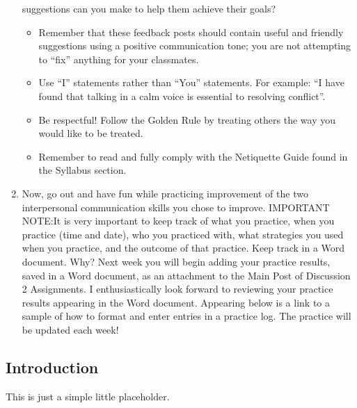 \documentclass[stu,12pt]{apa7}
\begin{document}
\begin{enumerate}
          suggestions can you make to help them achieve their goals?
          \begin{itemize}
            \item Remember that these feedback posts should contain useful and
              friendly suggestions using a positive communication tone; you are
              not attempting to “fix” anything for your classmates.
            \item Use “I” statements rather than “You” statements. For example:
              ``I have found that talking in a calm voice is essential to
              resolving conflict''.
            \item Be respectful! Follow the Golden Rule by treating others the
              way you would like to be treated.
            \item Remember to read and fully comply with the Netiquette Guide
              found in the Syllabus section. 
          \end{itemize}
        \item Now, go out and have fun while practicing improvement of the two
          interpersonal communication skills you chose to improve. IMPORTANT
          NOTE:\@ It is very important to keep track of what you practice, when
          you practice (time and date), who you practiced with, what strategies
          you used when you practice, and the outcome of that practice. Keep
          track in a Word document. Why? Next week you will begin adding your
          practice results, saved in a Word document, as an attachment to the
          Main Post of Discussion 2 Assignments. I enthusiastically look forward
          to reviewing your practice results appearing in the Word document.
          Appearing below is a link to a sample of how to format and enter
          entries in a practice log. The practice will be updated each week!
      \end{enumerate}

    \newpage
    \subsection{Introduction}
      This is just a simple little placeholder.


\end{document}
